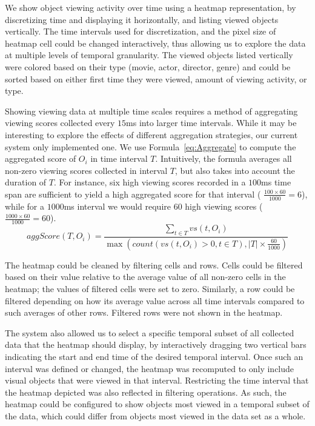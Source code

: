 We show object viewing activity over time using a heatmap representation, by discretizing time and displaying it horizontally, and listing viewed objects vertically. The time intervals used for discretization, and the pixel size of heatmap cell could be changed interactively, thus allowing us to explore the data at multiple levels of temporal granularity. The viewed objects listed vertically were colored based on their type (movie, actor, director, genre) and could be sorted based on either first time they were viewed, amount of viewing activity, or type. 

Showing viewing data at multiple time scales requires a method of aggregating viewing scores collected every $15$ms into larger time intervals. While it may be interesting to explore the effects of different aggregation strategies, our current system only implemented one. We use Formula~\ref{eq:Aggregate} to compute the aggregated score of $O_i$ in time interval $T$. Intuitively, the formula averages all non-zero viewing scores collected in interval $T$, but also takes into account the duration of $T$. For instance, six high viewing scores recorded in a $100$ms time span are sufficient to yield a high aggregated score for that interval ( $\frac{100 \times 60 }{1000} = 6$), while for a $1000$ms interval we would require $60$ high viewing scores ( $\frac{1000 \times 60 }{1000} = 60$).
\begin{equation}
aggScore(T,O_i) = \frac{\displaystyle\sum_{t \in T }{vs(t, O_i)}}{\max (count(vs(t, O_i) > 0 , t \in T),|T| \times \frac{60}{1000}) }
\label{eq:Aggregate}
\end{equation}

The heatmap could be cleaned by filtering cells and rows. Cells could be filtered based on their value relative to the average value of all non-zero cells in the heatmap; the values of filtered cells were set to zero. Similarly, a row could be filtered depending on how its average value across all time intervals compared to such averages of other rows. Filtered rows were not shown in the heatmap. 

The system also allowed us to select a specific temporal subset of all collected data that the heatmap should display, by interactively dragging two vertical bars indicating the start and end time of the desired temporal interval. Once such an interval was defined or changed, the heatmap was recomputed to only include visual objects that were viewed in that interval. Restricting the time interval that the heatmap depicted was also reflected in filtering operations. As such, the heatmap could be configured to show objects most viewed in a temporal subset of the data, which could differ from objects most viewed in the data set as a whole.

